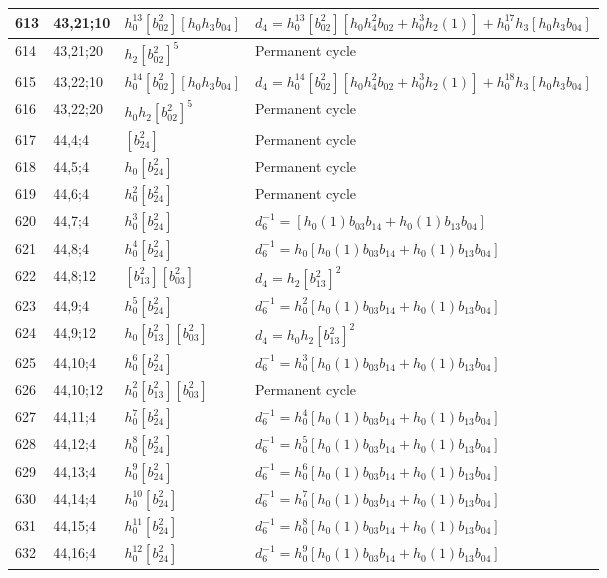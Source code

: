 \documentclass{article}
\begin{document}
\begin{longtable}{|l|l|>{\raggedright\arraybackslash}p{6cm}|>{\raggedright\arraybackslash}p{6cm}|}
\hline
613 & 43,21;10 & $h_0^{13}[b_{02}^2][h_0h_3b_{04}]$ &$d_{4}=h_0^{13}[b_{02}^2][h_0h_4^2b_{02} + h_0^3h_2(1)] + h_0^{17}h_3[h_0h_3b_{04}]$\\
\hline
614 & 43,21;20 & $h_2[b_{02}^2]^5$ & Permanent cycle\\
\hline
615 & 43,22;10 & $h_0^{14}[b_{02}^2][h_0h_3b_{04}]$ &$d_{4}=h_0^{14}[b_{02}^2][h_0h_4^2b_{02} + h_0^3h_2(1)] + h_0^{18}h_3[h_0h_3b_{04}]$\\
\hline
616 & 43,22;20 & $h_0h_2[b_{02}^2]^5$ & Permanent cycle\\
\hline
617 & 44,4;4 & $[b_{24}^2]$ & Permanent cycle\\
\hline
618 & 44,5;4 & $h_0[b_{24}^2]$ & Permanent cycle\\
\hline
619 & 44,6;4 & $h_0^2[b_{24}^2]$ & Permanent cycle\\
\hline
620 & 44,7;4 & $h_0^3[b_{24}^2]$ & $d_{6}^{-1}=[h_0(1)b_{03}b_{14} + h_0(1)b_{13}b_{04}]$\\
\hline
621 & 44,8;4 & $h_0^4[b_{24}^2]$ & $d_{6}^{-1}=h_0[h_0(1)b_{03}b_{14} + h_0(1)b_{13}b_{04}]$\\
\hline
622 & 44,8;12 & $[b_{13}^2][b_{03}^2]$ &$d_{4}=h_2[b_{13}^2]^2$\\
\hline
623 & 44,9;4 & $h_0^5[b_{24}^2]$ & $d_{6}^{-1}=h_0^2[h_0(1)b_{03}b_{14} + h_0(1)b_{13}b_{04}]$\\
\hline
624 & 44,9;12 & $h_0[b_{13}^2][b_{03}^2]$ &$d_{4}=h_0h_2[b_{13}^2]^2$\\
\hline
625 & 44,10;4 & $h_0^6[b_{24}^2]$ & $d_{6}^{-1}=h_0^3[h_0(1)b_{03}b_{14} + h_0(1)b_{13}b_{04}]$\\
\hline
626 & 44,10;12 & $h_0^2[b_{13}^2][b_{03}^2]$ & Permanent cycle\\
\hline
627 & 44,11;4 & $h_0^7[b_{24}^2]$ & $d_{6}^{-1}=h_0^4[h_0(1)b_{03}b_{14} + h_0(1)b_{13}b_{04}]$\\
\hline
628 & 44,12;4 & $h_0^8[b_{24}^2]$ & $d_{6}^{-1}=h_0^5[h_0(1)b_{03}b_{14} + h_0(1)b_{13}b_{04}]$\\
\hline
629 & 44,13;4 & $h_0^9[b_{24}^2]$ & $d_{6}^{-1}=h_0^6[h_0(1)b_{03}b_{14} + h_0(1)b_{13}b_{04}]$\\
\hline
630 & 44,14;4 & $h_0^{10}[b_{24}^2]$ & $d_{6}^{-1}=h_0^7[h_0(1)b_{03}b_{14} + h_0(1)b_{13}b_{04}]$\\
\hline
631 & 44,15;4 & $h_0^{11}[b_{24}^2]$ & $d_{6}^{-1}=h_0^8[h_0(1)b_{03}b_{14} + h_0(1)b_{13}b_{04}]$\\
\hline
632 & 44,16;4 & $h_0^{12}[b_{24}^2]$ & $d_{6}^{-1}=h_0^9[h_0(1)b_{03}b_{14} + h_0(1)b_{13}b_{04}]$\\

\end{longtable}
\end{document}
